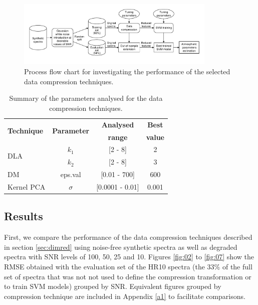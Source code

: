\documentclass[a4paper,fleqn,usenatbib]{mnras}
\begin{document}
{\begin{figure}
\centering\includegraphics[width=0.85\textwidth]{flowchart.pdf}
\caption{Process flow chart for investigating the performance of the 
selected data compression techniques.}
\label{fig:flowchart}
\end{figure}

\begin{table}
\centering
\caption{Summary of the parameters analysed for the 
data compression techniques.}
\label{tab:parameters}
\begin{tabular}{l c c c}
\hline
\multirow{2}{*}{\textbf{Technique}} & \multirow{2}{*}{\textbf{Parameter}} & \textbf{Analysed} &  \textbf{Best} \\
  	&   & \textbf{range} & \textbf{value} \\
\hline
\multirow{2}{*}{DLA} 
	& $k_1$ & [2 - 8]  & 2 \\\cline{2-4}
	& $k_2$ & [2 - 8]  & 3 \\\hline
DM & eps.val & [0.01 - 700] & 600 \\\hline
Kernel PCA & $\sigma$ & [0.0001 - 0.01] & 0.001 \\
\hline
\end{tabular}
\end{table}

\subsection{Results}

First, we compare the performance of the data compression
techniques described in section \ref{sec:dimred} using noise-free
synthetic spectra as well as degraded spectra with SNR levels of 100,
50, 25 and 10. Figures \ref{fig:02} to \ref{fig:07} show the RMSE
obtained with the evaluation set of the HR10 spectra (the 33\% 
of the full set of spectra that was not not used to define the 
compression transformation or to train SVM models) grouped by SNR. 
Equivalent figures grouped by compression technique are included in 
Appendix \ref{a1} to facilitate comparisons.

}
\end{document}
